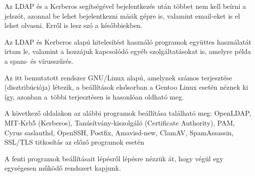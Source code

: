 Az LDAP és a Kerberos segítségével bejelentkezés után többet nem kell beírni a jelszót, azonnal be lehet bejelentkezni
másik gépre is, valamint email-eket is el lehet olvasni. Erről is lesz szó a későbbiekben.

Az LDAP és Kerberos alapú hitelesítést használó programok együttes használatát írtam le, valamint a hozzájuk
kapcsolódó egyéb szolgáltatásokat is, amelyre példa a spam- és vírusszűrés.

Az itt bemutatott rendszer GNU/Linux alapú, amelynek számos terjesztése (disztribúciója) létezik, a beállítások
elsősorban a Gentoo Linux esetén néznek ki így, azonban a~többi terjesztésen is hasonlóan oldható meg.

A következő oldalakon az alábbi programok beállítása található meg:
OpenLDAP,
MIT-Krb5 (Kerberos),
Tanúsítvány-kiszolgáló (Certificate Authority),
PAM,
Cyrus saslauthd,
OpenSSH,
Postfix,
Amavisd-new,
ClamAV,
SpamAssassin,
SSL/TLS titkosítás az előző programok esetén
  
A fenti programok beállításait lépésről lépésre nézzük át, hogy végül egy egységesen működő rendszert kapjunk.
  
